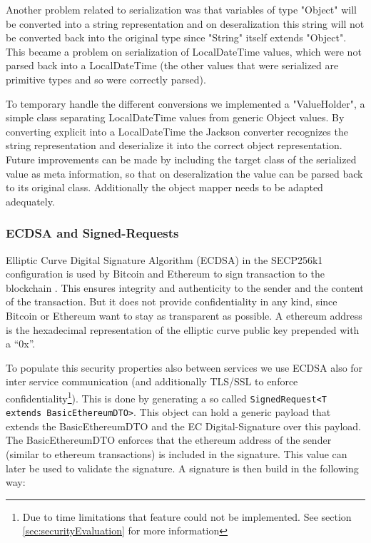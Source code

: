 Another problem related to serialization was that variables of type "Object" will be converted into a string representation and on deseralization this string will not be converted back into the original type since "String" itself extends "Object". This became a problem on serialization of LocalDateTime values, which were not parsed back into a LocalDateTime (the other values that were serialized are primitive types and so were correctly parsed). 

To temporary handle the different conversions we implemented a "ValueHolder", a simple class separating LocalDateTime values from generic Object values. By converting explicit into a LocalDateTime the Jackson converter recognizes the string representation and deserialize it into the correct object representation. Future improvements can be made by including the target class of the serialized value as meta information, so that on deseralization the value can be parsed back to its original class. Additionally the object mapper needs to be adapted adequately. 

\subsubsection{ECDSA and Signed-Requests}
\label{sec:ecdsa}

Elliptic Curve Digital Signature Algorithm (ECDSA) in the SECP256k1 configuration is used by Bitcoin and Ethereum to sign transaction to the blockchain \cite{mayer2016ecdsa}. This ensures integrity and authenticity to the sender and the content of the transaction. But it does not provide confidentiality in any kind, since Bitcoin or Ethereum want to stay as transparent as possible. 
A ethereum address is the hexadecimal representation of the elliptic curve public key prepended with a “0x”. 

To populate this security properties also between services we use ECDSA also for inter service communication (and additionally TLS/SSL to enforce confidentiality\footnote{Due to time limitations that feature could not be implemented. See section \ref{sec:securityEvaluation} for more information}). This is done by generating a so called \lstinline{SignedRequest<T extends BasicEthereumDTO>}. This object can hold a generic payload that extends the BasicEthereumDTO and the EC Digital-Signature over this payload. The BasicEthereumDTO enforces that the ethereum address of the sender (similar to ethereum transactions) is included in the signature. This value can later be used to validate the signature. A signature is then build in the following way: 


